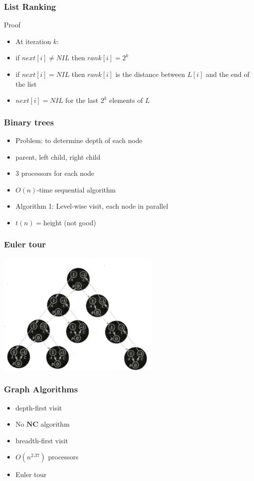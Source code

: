 \documentclass[12pt,aspectratio=169]{beamer}
\begin{document}
\begin{frame}\frametitle{List Ranking}
\begin{block}{Proof}
  \begin{itemize}
  \item
    At iteration $k$:
  \item
    if $next[i] \neq NIL$ then $rank[i] = 2^{k}$
  \item
    if $next[i] = NIL$ then $rank[i]$ is the distance between $L[i]$ and the end of the
    list
  \item
    $next[i] = NIL$ for the last $2^{k}$ elements of $L$
  \end{itemize}
\end{block}
\end{frame}
\begin{frame}\frametitle{Binary trees}
  \begin{itemize}
  \item
    Problem: to determine depth of each node
  \item
    parent, left child, right child
  \item
    $3$ processors for each node
  \item
    $O(n)$-time sequential algorithm
  \item
    Algorithm 1: Level-wise visit, each node in parallel
  \item
    $t(n)=$height (not good)
  \end{itemize}
\end{frame}


\begin{frame}\frametitle{Euler tour}
  \begin{center}
    \includegraphics[width=8cm]{euler1.png}
  \end{center}

\end{frame}

\begin{frame}\frametitle{Graph Algorithms}
  \begin{itemize}
  \item
    depth-first visit
  \item
    No $\mathbf{NC}$ algorithm
  \item
    breadth-first visit
  \item
    $O(n^{2.37})$ processors
  \item
    \alert{Euler tour}
  \end{itemize}
\end{frame}
\end{document}
